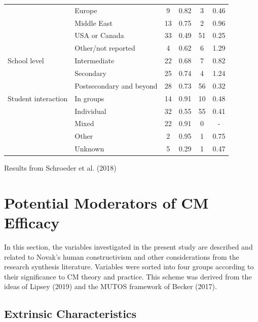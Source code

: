 \documentclass[
  letterpaper,
  DIV=11,
  numbers=noendperiod]{scrartcl}
\begin{document}
\begin{longtable*}{l|l|cccc}
 & Europe & 9 & 0.82 & 3 & 0.46 \\ 
 & Middle East & 13 & 0.75 & 2 & 0.96 \\ 
 & USA or Canada & 33 & 0.49 & 51 & 0.25 \\ 
 & Other/not reported & 4 & 0.62 & 6 & 1.29 \\ 
\midrule
School level & Intermediate & 22 & 0.68 & 7 & 0.82 \\ 
 & Secondary & 25 & 0.74 & 4 & 1.24 \\ 
 & Postsecondary and beyond & 28 & 0.73 & 56 & 0.32 \\ 
\midrule
Student interaction & In groups & 14 & 0.91 & 10 & 0.48 \\ 
 & Individual & 32 & 0.55 & 55 & 0.41 \\ 
 & Mixed & 22 & 0.91 & 0 & - \\ 
 & Other & 2 & 0.95 & 1 & 0.75 \\ 
 & Unknown & 5 & 0.29 & 1 & 0.47 \\ 
\bottomrule
\end{longtable*}
\begin{minipage}{\linewidth}
Results from Schroeder et al. (2018)\\
\end{minipage}

\hypertarget{potential-moderators-of-cm-efficacy}{%
\section{Potential Moderators of CM
Efficacy}\label{potential-moderators-of-cm-efficacy}}

In this section, the variables investigated in the present study are
described and related to Novak's human constructivism and other
considerations from the research synthesis literature. Variables were
sorted into four groups according to their significance to CM theory and
practice. This scheme was derived from the ideas of Lipsey (2019) and
the MUTOS framework of Becker (2017).

\hypertarget{extrinsic-characteristics}{%
\subsection{Extrinsic Characteristics}\label{extrinsic-characteristics}}
\end{document}
